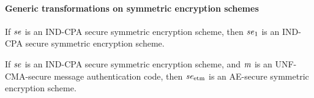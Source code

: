 \paragraph{Generic transformations on symmetric encryption schemes}
\begin{theorem}
If $\mathit{{se}}$ is an IND-CPA secure symmetric encryption scheme, then $\mathit{{se}}_1$ is an IND-CPA secure symmetric encryption scheme.
\begin{center}
\begin{theorem}[AE]
If $\mathit{{se}}$ is an IND-CPA secure symmetric encryption scheme, and $\mathit{{m}}$ is an UNF-CMA-secure message authentication code, then
$\mathit{{se}}_{\text{etm}}$ is an AE-secure symmetric encryption scheme.
\end{theorem}

\begin{pchstack}
        \pcvspace
    \pchspace
    \pchspace
		\end{pchstack}
\end{center}

\end{theorem}